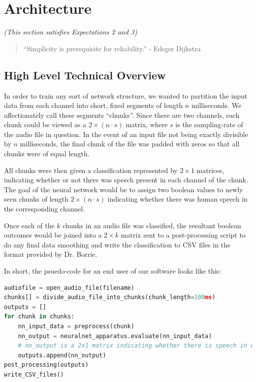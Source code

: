 \documentclass[11pt]{article}
\begin{document}
\newpage






\newpage\section{Architecture}
\textit{(This section satisfies Expectations 2 and 3)}

\begin{quote}
\centering
``Simplicity is prerequisite for reliability.'' - Edsger Dijkstra
\end{quote}

\subsection{High Level Technical Overview}

In order to train any sort of network structure, we wanted to partition the input data from each channel into short, fixed segments of length $n$ milliseconds. We affectionately call these segments ``chunks''. Since there are two channels, each chunk could be viewed as a $2\times (n\cdot s)$ matrix, where $s$ is the sampling-rate of the audio file in question. In the event of an input file not being exactly divisible by $n$ milliseconds, the final chunk of the file was padded with zeros so that all chunks were of equal length.

All chunks were then given a classification represented by $2\times 1$ matrices, indicating whether or not there was speech present in each channel of the chunk. The goal of the neural network would be to assign two boolean values to newly seen chunks of length $2\times (n\cdot s)$ indicating whether there was human speech in the corresponding channel.

Once each of the $k$ chunks in an audio file was classified, the resultant boolean outcomes would be joined into a $2\times k$ matrix sent to a post-processing script to do any final data smoothing and write the classification to CSV files in the format provided by Dr. Borrie.

In short, the psuedo-code for an end user of our software looks like this:

\begin{minipage}{\linewidth}
\begin{lstlisting}[language=Python]
audiofile = open_audio_file(filename)
chunks[] = divide_audio_file_into_chunks(chunk_length=100ms)
outputs = []
for chunk in chunks:
	nn_input_data = preprocess(chunk)
	nn_output = neuralnet_apparatus.evaluate(nn_input_data)
    # nn_output is a 2x1 matrix indicating whether there is speech in each channel of the chunk
    outputs.append(nn_output)
post_processing(outputs)
write_CSV_files()
\end{lstlisting}
\end{minipage}
\end{document}
